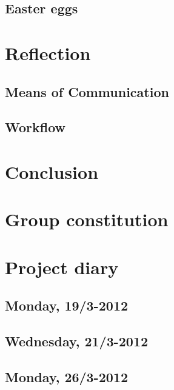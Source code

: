 \documentclass[a4paper,11pt]{article}
\begin{document}
\subsection{Easter eggs}


\pagebreak
\section{Reflection}
\subsection{Means of Communication}


\subsection{Workflow}


\pagebreak
\section{Conclusion}
\label{sec:Conclusion}


\pagebreak
\appendix
\section{Group constitution}
\label{sec:Constitution}



\pagebreak
\section{Project diary}
\label{sec:Diary}

\subsection{Monday, 19/3-2012}


\pagebreak
\subsection{Wednesday, 21/3-2012}


\pagebreak
\subsection{Monday, 26/3-2012}

\end{document}
